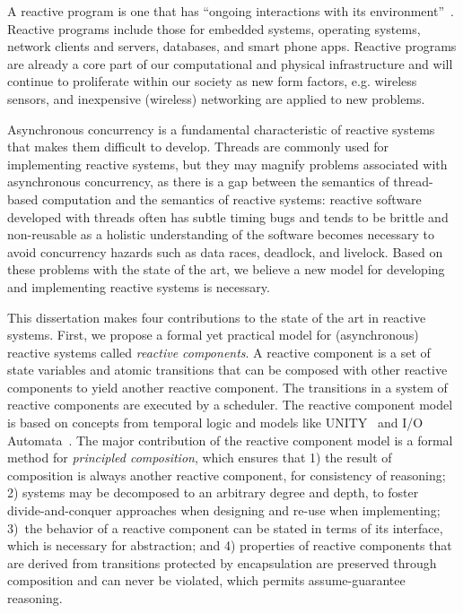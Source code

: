 A reactive program is one that has ``ongoing interactions with its environment''~\cite{manna1992temporal}.
Reactive programs include those for embedded systems, operating systems, network clients and servers, databases, and smart phone apps.
Reactive programs are already a core part of our computational and physical infrastructure and will continue to proliferate within our society as new form factors, e.g. wireless sensors, and inexpensive (wireless) networking are applied to new problems.

Asynchronous concurrency is a fundamental characteristic of reactive systems that makes them difficult to develop.
Threads are commonly used for implementing reactive systems, but they may magnify problems associated with asynchronous concurrency, as there is a gap between the semantics of thread-based computation and the semantics of reactive systems:  reactive software developed with threads often has subtle timing bugs and tends to be brittle and non-reusable as a holistic understanding of the software becomes necessary to avoid concurrency hazards such as data races, deadlock, and livelock.
Based on these problems with the state of the art, we believe a new model for developing and implementing reactive systems is necessary.

This dissertation makes four contributions to the state of the art in reactive systems.
First, we propose a formal yet practical model for (asynchronous) reactive systems called \emph{reactive components}.
A reactive component is a set of state variables and atomic transitions that can be composed with other reactive components to yield another reactive component.
The transitions in a system of reactive components are executed by a scheduler.
The reactive component model is based on concepts from temporal logic and models like UNITY~\cite{chandy1989parallel} and I/O Automata~\cite{nancy1996distributed}.
The major contribution of the reactive component model is a formal method for \emph{principled composition}, which ensures that 1) the result of composition is always another reactive component, for consistency of reasoning; 2) systems may be decomposed to an arbitrary degree and depth, to foster divide-and-conquer approaches when designing and re-use when implementing; 3)~the behavior of a reactive component can be stated in terms of its interface, which is necessary for abstraction; and 4) properties of reactive components that are derived from transitions protected by encapsulation are preserved through composition and can never be violated, which permits assume-guarantee reasoning.

